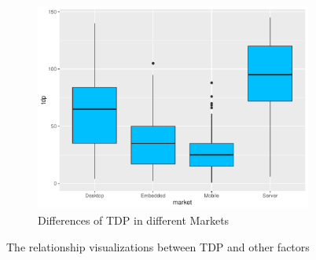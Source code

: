 \begin{figure}[H]
\begin{subfigure}[b]{0.45\textwidth}
        \label{fig:tdp_analysis_temp}
    \end{subfigure}
    \hfill
    \begin{subfigure}[b]{0.45\textwidth}
        \centering
        \includegraphics[width=\textwidth]{./graphics/box_tdp_market.pdf}
        \caption{Differences of TDP in different Markets}
        \label{fig:tdp_analysis_market}
    \end{subfigure}

    \caption{The relationship visualizations between TDP and other factors}
    \label{fig:tdp_analysis}
\end{figure}

